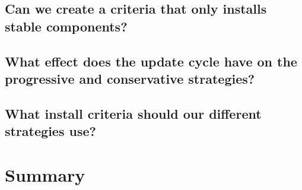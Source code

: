 \subsection{Can we create a criteria that only installs stable components?}

\subsection{What effect does the update cycle have on the progressive and conservative strategies?}

\subsection{What install criteria should our different strategies use?}


\section{Summary}
